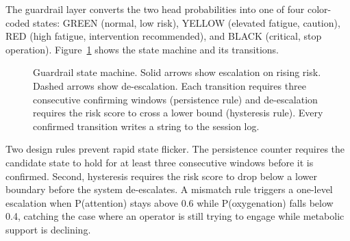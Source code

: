 \documentclass[conference]{IEEEtran}
\begin{document}
The guardrail layer converts the two head probabilities into one of four color-coded states: GREEN (normal, low risk), YELLOW (elevated fatigue, caution), RED (high fatigue, intervention recommended), and BLACK (critical, stop operation). Figure~\ref{fig:guardrail} shows the state machine and its transitions.

\begin{figure}[htbp]
\centering
{}
\caption{Guardrail state machine. Solid arrows show escalation on rising risk. Dashed arrows show de-escalation. Each transition requires three consecutive confirming windows (persistence rule) and de-escalation requires the risk score to cross a lower bound (hysteresis rule). Every confirmed transition writes a string to the session log.}
\label{fig:guardrail}
\end{figure}

Two design rules prevent rapid state flicker. The persistence counter requires the candidate state to hold for at least three consecutive windows before it is confirmed. Second, hysteresis requires the risk score to drop below a lower boundary before the system de-escalates. A mismatch rule triggers a one-level escalation when P(attention) stays above 0.6 while P(oxygenation) falls below 0.4, catching the case where an operator is still trying to engage while metabolic support is declining.
\end{document}
